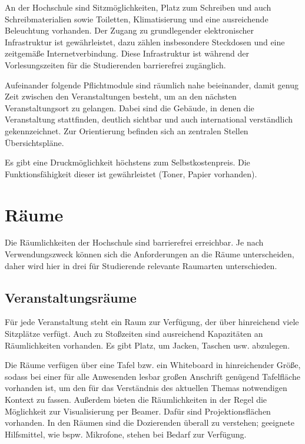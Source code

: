 An der Hochschule sind Sitzmöglichkeiten, Platz zum Schreiben und auch Schreibmaterialien sowie Toiletten, Klimatisierung und eine ausreichende Beleuchtung vorhanden. Der Zugang zu grundlegender elektronischer Infrastruktur ist gewährleistet, dazu zählen insbesondere Steckdosen und eine zeitgemäße Internetverbindung. Diese Infrastruktur ist während der Vorlesungszeiten für die Studierenden barrierefrei zugänglich.

Aufeinander folgende Pflichtmodule sind räumlich nahe beieinander, damit genug Zeit zwischen den Veranstaltungen besteht, um an den nächsten Veranstaltungsort zu gelangen. Dabei sind die Gebäude, in denen die Veranstaltung stattfinden, deutlich sichtbar und auch international verständlich gekennzeichnet. Zur Orientierung befinden sich an zentralen Stellen Übersichtspläne.

Es gibt eine Druckmöglichkeit höchstens zum Selbstkostenpreis. Die Funktionsfähigkeit dieser ist gewährleistet (Toner, Papier vorhanden).

\section{Räume}

Die Räumlichkeiten der Hochschule sind barrierefrei erreichbar. Je nach Verwendungszweck können sich die Anforderungen an die Räume unterscheiden, daher wird hier in drei für Studierende relevante Raumarten unterschieden.

\subsection{Veranstaltungsräume}

Für jede Veranstaltung steht ein Raum zur Verfügung, der über hinreichend viele Sitzplätze verfügt. Auch zu Stoßzeiten sind ausreichend Kapazitäten an Räumlichkeiten vorhanden. Es gibt Platz, um Jacken, Taschen usw. abzulegen.

Die Räume verfügen über eine Tafel bzw. ein Whiteboard in hinreichender Größe, sodass bei einer für alle Anwesenden lesbar großen Anschrift genügend Tafelfläche vorhanden ist, um den für das Verständnis des aktuellen Themas notwendigen Kontext zu fassen. Außerdem bieten die Räumlichkeiten in der Regel die Möglichkeit zur Visualisierung per Beamer. Dafür sind Projektionsflächen vorhanden. In den Räumen sind die Dozierenden überall zu verstehen; geeignete Hilfsmittel, wie bspw. Mikrofone, stehen bei Bedarf zur Verfügung.

